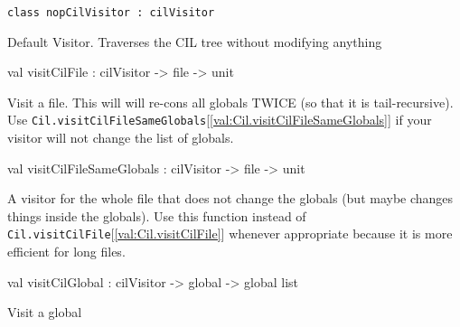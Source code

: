 \documentclass[11pt]{article}
\begin{document}
\begin{ocamldoccode}
{\tt{class nopCilVisitor : }}{\tt{cilVisitor}}\end{ocamldoccode}
\label{class:Cil.nopCilVisitor}



\begin{ocamldocdescription}
Default Visitor. Traverses the CIL tree without modifying anything


\end{ocamldocdescription}




\label{val:Cil.visitCilFile}\begin{ocamldoccode}
val visitCilFile : cilVisitor -> file -> unit
\end{ocamldoccode}
\begin{ocamldocdescription}
Visit a file. This will will re-cons all globals TWICE (so that it is 
 tail-recursive). Use {\tt{Cil.visitCilFileSameGlobals}}[\ref{val:Cil.visitCilFileSameGlobals}] if your visitor will 
 not change the list of globals.


\end{ocamldocdescription}




\label{val:Cil.visitCilFileSameGlobals}\begin{ocamldoccode}
val visitCilFileSameGlobals : cilVisitor -> file -> unit
\end{ocamldoccode}
\begin{ocamldocdescription}
A visitor for the whole file that does not change the globals (but maybe
 changes things inside the globals). Use this function instead of
 {\tt{Cil.visitCilFile}}[\ref{val:Cil.visitCilFile}] whenever appropriate because it is more efficient for
 long files.


\end{ocamldocdescription}




\label{val:Cil.visitCilGlobal}\begin{ocamldoccode}
val visitCilGlobal : cilVisitor -> global -> global list
\end{ocamldoccode}
\begin{ocamldocdescription}
Visit a global


\end{ocamldocdescription}
\end{document}
